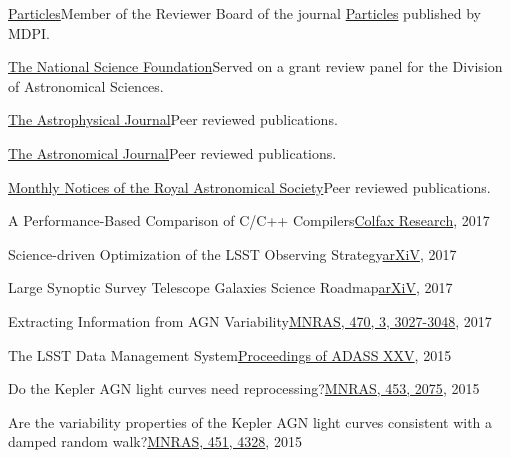 \documentclass[10pt,a4paper]{article}
\begin{document}
\spacedhrule{2.0em}{0.2em}


\inlineheadsection
  {\href{https://www.mdpi.com/journal/particles/submission_reviewers}{Particles}}{Member of the Reviewer Board of the journal \href{https://www.mdpi.com/journal/particles}{Particles} published by MDPI.}

\inlineheadsection
  {\href{https://www.nsf.gov/}{The National Science Foundation}}{Served on a grant review panel for the Division of Astronomical Sciences.}

\inlineheadsection
  {\href{http://iopscience.iop.org/journal/0004-637X}{The Astrophysical Journal}}{Peer reviewed publications.}

\inlineheadsection
  {\href{https://iopscience.iop.org/journal/1538-3881}{The Astronomical Journal}}{Peer reviewed publications.}

\inlineheadsection
  {\href{https://academic.oup.com/mnras}{Monthly Notices of the Royal Astronomical Society}}{Peer reviewed publications.}

\spacedhrule{2.0em}{0.2em}



\inlineheadsection
  {A Performance-Based Comparison of C/C++ Compilers}{\href{https://colfaxresearch.com/compiler-comparison/}{Colfax Research}, 2017}

\inlineheadsection
  {Science-driven Optimization of the LSST Observing Strategy}{\href{https://arxiv.org/abs/1708.04058}{arXiV}, 2017}

\inlineheadsection
  {Large Synoptic Survey Telescope Galaxies Science Roadmap}{\href{https://arxiv.org/abs/1708.01617}{arXiV}, 2017}

\inlineheadsection
  {Extracting Information from AGN Variability}{\href{https://doi.org/10.1093/mnras/stx1420}{MNRAS, 470, 3, 3027-3048}, 2017}

\inlineheadsection
  {The LSST Data Management System}{\href{http://adsabs.harvard.edu/cgi-bin/bib_query?arXiv:1512.07914}{Proceedings of ADASS XXV}, 2015}

\inlineheadsection
  {Do the Kepler AGN light curves need reprocessing?}{\href{http://dx.doi.org/10.1093/mnras/stv1797}{MNRAS, 453, 2075}, 2015}

\inlineheadsection
  {Are the variability properties of the Kepler AGN light curves consistent with a damped random walk?}{\href{http://dx.doi.org/ 10.1093/mnras/stv1230}{MNRAS, 451, 4328}, 2015}
\end{document}
